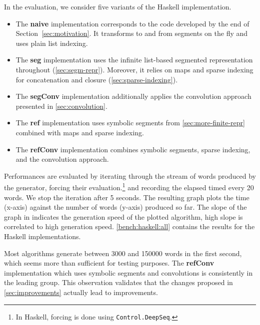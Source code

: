 In the evaluation, we consider five variants of the Haskell implementation.
\begin{itemize}
\item The \textbf{naive} implementation corresponds to the code developed by
  the end of Section~\ref{sec:motivation}. It transforms to and from
  segments on the fly and uses plain list indexing.
\item The \textbf{seg} implementation uses the infinite list-based segmented
  representation throughout (\cref{sec:segm-repr}). Moreover,
  it relies on maps and sparse indexing for concatenation and closure
  (\cref{sec:sparse-indexing}).
\item The \textbf{segConv} implementation additionally
  applies the convolution approach presented in \cref{sec:convolution}.
\item The \textbf{ref} implementation uses symbolic segments
  from \cref{sec:more-finite-repr} combined with
  maps and sparse indexing.
\item The \textbf{refConv} implementation combines
   symbolic segments, sparse indexing, and the convolution approach.
\end{itemize}

Performances are evaluated by iterating through the stream of words
produced by the generator, forcing their evaluation.\footnote{In
  Haskell, forcing is done using \lstinline{Control.DeepSeq}.}
and recording the elapsed timed every 20 words.
We stop the iteration after 5 seconds.
The resulting graph plots the time (x-axis) against the number of words (y-axis) produced so far. The slope of the graph in indicates the generation speed of the plotted algorithm, high slope is correlated to high generation speed.  \cref{bench:haskell:all} contains the results for the Haskell implementations.

Most algorithms generate between 3000 and 150000 words in the first
second, which seems more than sufficient for testing purposes.
The \textbf{refConv} implementation
which uses symbolic segments and convolutions is consistently in the
leading group.
This observation validates that the
changes proposed in \cref{sec:improvements} actually lead to
improvements.

